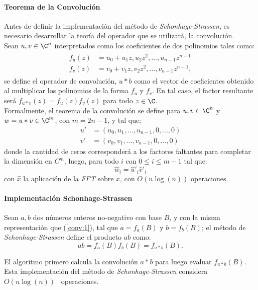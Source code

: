 \paragraph{Teorema de la Convolución} Antes de definir la implementación del método de \textit{Schonhage-Strassen}, es necesario desarrollar la teoría del operador que se utilizará, la convolución.\\

Sean $u,v\in\C^{n}$ interpretados como los coeficientes de dos polinomios tales como:
\begin{align}
\begin{split}
    f_{u}(z) &= u_{0} + u_{1}z, u_{2}z^{2}, ... , u_{n-1}z^{n-1}\\
    f_{v}(z) &= v_{0} + v_{1}z, v_{2}z^{2}, ... , v_{n-1}z^{n-1},
\end{split}\label{conv:1}
\end{align}
se define el operador de convolución, $u*b$ como el vector de coeficientes obtenido al multiplicar los polinomios de la forma $f_{u}$ y $f_{v}$. En tal caso, el factor resultante será $f_{u*v}(z)=f_{u}(z)f_{v}(z)$ para todo $z\in\C$.\\

Formalmente, el teorema de la convolución se define para $u,v\in\C^{n}$ y $w=u*v\in\C^{m}$, con $m=2n-1$, y tal que:
\begin{align*}
    u' &= (u_{0},u_{1},...,u_{n-1},0,...,0)\\
    v' &= (v_{0},v_{1},...,v_{n-1},0,...,0)
\end{align*}
donde la cantidad de ceros corresponderá a los factores faltantes para completar la dimensión en $C^{m}$, luego, para todo $i$ con $0\leq i \leq m-1$ tal que:
\begin{equation}
    \hat{w}_{i} = \hat{u}'_{i}\hat{v}'_{i}
\end{equation}
con $\hat{x}$ la aplicación de la \textit{FFT} sobre $x$, con $O(n\log(n))$ operaciones.


\paragraph{Implementación Schonhage-Strassen}
Sean $a,b$ dos números enteros no-negativo con base $B$, y con la misma representación que (\ref{conv:1}), tal que $a=f_{a}(B)$ y $b=f_{b}(B)$; el método de \textit{Schonhage-Strassen} define el producto $ab$ como:
\begin{equation}
    ab = f_{a}(B)f_{b}(B) = f_{a*b}(B).
\end{equation}

El algoritmo primero calcula la convolución $a*b$ para luego evaluar $f_{a*b}(B)$. Esta implementación del método de \textit{Schonhage-Strassen}  considera $O(n\log(n))$~\cite{DBLP:journals/corr/abs-1006-0405} operaciones.


